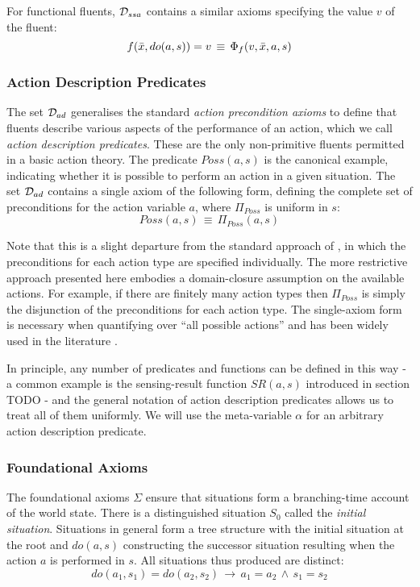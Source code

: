 For functional fluents, $\mathcal{D}_{ssa}$ contains a similar axioms specifying
the value $v$ of the fluent:\[
f(\bar{x},do(a,s))=v\,\equiv\,\Phi_{f}(v,\bar{x},a,s)\]



\subsubsection{Action Description Predicates}

The set $\mathcal{D}_{ad}$ generalises the standard \emph{action precondition
axioms} \citep{pirri99contributions_sitcalc} to define that fluents
describe various aspects of the performance of an action, which we
call \emph{action description predicates}. These are the only non-primitive
fluents permitted in a basic action theory. The predicate $Poss(a,s)$
is the canonical example, indicating whether it is possible to perform
an action in a given situation. The set $\mathcal{D}_{ad}$ contains a single
axiom of the following form, defining the complete set of preconditions
for the action variable $a$, where $\Pi_{Poss}$ is uniform in $s$:\[
Poss(a,s)\,\equiv\,\Pi_{Poss}(a,s)\]


Note that this is a slight departure from the standard approach of
\citep{pirri99contributions_sitcalc}, in which the preconditions
for each action type are specified individually. The more restrictive
approach presented here embodies a domain-closure assumption on the
available actions. For example, if there are finitely many action
types then $\Pi_{Poss}$ is simply the disjunction of the preconditions
for each action type. The single-axiom form is necessary when quantifying
over {}``all possible actions'' and has been widely used in the
literature \citep{vassos08progression_future_queries,savelli06sc_quantum_levels}.

In principle, any number of predicates and functions can be defined
in this way - a common example is the sensing-result function $SR(a,s)$
introduced in section TODO - and the general notation of action description
predicates allows us to treat all of them uniformly. We will use the
meta-variable $\alpha$ for an arbitrary action description predicate.


\subsubsection{Foundational Axioms}

The foundational axioms $\Sigma$ ensure that situations form a branching-time
account of the world state. There is a distinguished situation $S_{0}$
called the \emph{initial situation}. Situations in general form a
tree structure with the initial situation at the root and $do(a,s)$
constructing the successor situation resulting when the action $a$
is performed in $s$. All situations thus produced are distinct:\[
do(a_{1},s_{1})=do(a_{2},s_{2})\,\rightarrow\, a_{1}=a_{2}\,\wedge\, s_{1}=s_{2}\]



